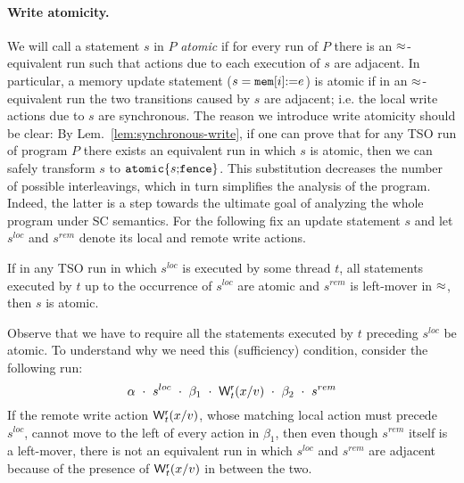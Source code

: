\paragraph{Write atomicity.}
We will call a statement $s$ in $P$ {\em atomic} if for every run of $P$ there is an $\approx$-equivalent run such that actions due to each execution of $s$ are adjacent. 
In particular, a memory update statement ($s=\mathtt{mem}[i]\mathtt{:=} e$) is atomic if in an $\approx$-equivalent run the two transitions caused by $s$ are adjacent; i.e. the local write actions due to $s$ are synchronous.
The reason we introduce write atomicity should be clear: By Lem.~\ref{lem:synchronous-write}, if one can prove that for any TSO run of program $P$ there exists an equivalent run in which $s$ is atomic, then we can safely transform $s$ to $\mathtt{atomic}\{s\mathtt{;} \mathtt{fence}\}$.
This substitution decreases the number of possible interleavings, which in turn simplifies the analysis of the program.
Indeed, the latter is a step towards the ultimate goal of analyzing the whole program under SC semantics.
For the following fix an update statement $s$ and let $s^{loc}$ and $s^{rem}$ denote its local and remote write actions.
\begin{lemma}
If in any TSO run in which $s^{loc}$ is executed by some thread $t$, all statements executed by $t$ up to the occurrence of $s^{loc}$ are atomic and $s^{rem}$ is left-mover in $\approx$, then $s$ is atomic.
\end{lemma}
Observe that we have to require all the statements executed by $t$ preceding $s^{loc}$ be atomic.
To understand why we need this (sufficiency) condition, consider the following run:
\[
\mathbf{\alpha}\ \cdot\ s^{loc}\ \cdot\ \mathbf{\beta}_1\ \cdot\ \remwritex t x v\ \cdot\ \mathbf{\beta}_2\ \cdot\ s^{rem}
\]
If the remote write action $\mathsf{W}^{\mathsf{r}}_{t}(x/v)$, whose matching local action must precede $s^{loc}$, cannot move to the left of every action in $\beta_1$, then even though $s^{rem}$ itself is a left-mover, there is not an equivalent run in which $s^{loc}$ and $s^{rem}$ are adjacent because of the presence of $\mathsf{W}^{\mathsf{r}}_{t}(x/v)$ in between the two.

